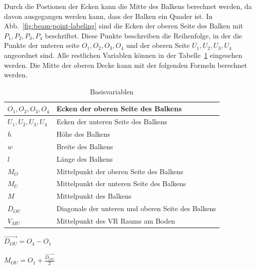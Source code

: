 Durch die Postionen der Ecken kann die Mitte des Balkens berechnet werden, da davon ausgegangen werden kann, dass der Balken ein Quader ist.
In Abb.~\ref{fig:beam-point-labeling} sind die Ecken der oberen Seite des Balken mit $P_{1}, P_{2}, P_{3}, P_{4}$ beschriftet.
Diese Punkte beschreiben die Reihenfolge, in der die Punkte der unteren seite $O_{1}, O_{2}, O_{3}, O_{4}$ und der oberen Seite $U_{1}, U_{2}, U_{3}, U_{4}$ angeordnet sind.
Alle restlichen Variablen können in der Tabelle~\ref{tab:variables} eingesehen werden.
Die Mitte der oberen Decke kann mit der folgenden Formeln berechnet werden.

\begin{table}[]
    \centering
    \begin{tabular}{|l|l|}
        \hline
        $O_{1}, O_{2}, O_{3}, O_{4}$ & Ecken der oberen Seite des Balkens                 \\ \hline
        $U_{1}, U_{2}, U_{3}, U_{4}$ & Ecken der unteren Seite des Balkens                \\ \hline
        $h$                          & Höhe des Balkens                                   \\ \hline
        $w$                          & Breite des Balkens                                 \\ \hline
        $l$                          & Länge des Balkens                                  \\ \hline
        $M_{O}$                      & Mittelpunkt der oberen Seite des Balkens           \\ \hline
        $M_{U}$                      & Mittelpunkt der unteren Seite des Balkens          \\ \hline
        $M$                          & Mittelpunkt des Balkens                            \\ \hline
        $D_{OU}$                     & Diagonale der unteren und oberen Seite des Balkens \\ \hline
        $V_{MU}$                     & Mittelpunkt des VR Raums am Boden                  \\ \hline
    \end{tabular}
    \caption{Basisvariablen}
    \label{tab:variables}
\end{table}

\pagebreak

$\vec{D_{OU}} = O_{4} - O_{1}$

$M_{OU} = O_{1} +  \frac{\vec{D_{OU}}}{2} $


